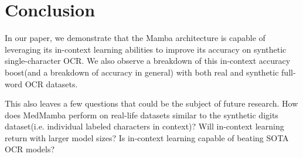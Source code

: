 \section{Conclusion}
In our paper, we demonstrate that the Mamba architecture is capable of
leveraging its in-context learning abilities to improve its accuracy on
synthetic single-character OCR.
We also observe a breakdown of this in-context accuracy boost(and a breakdown of
accuracy in general) with both real and synthetic full-word OCR datasets.

This also leaves a few questions that could be the subject of future research.
How does MedMamba perform on real-life datasets similar to the synthetic digits
dataset(i.e. individual labeled characters in context)?
Will in-context learning return with larger model sizes?
Is in-context learning capable of beating SOTA OCR models?
